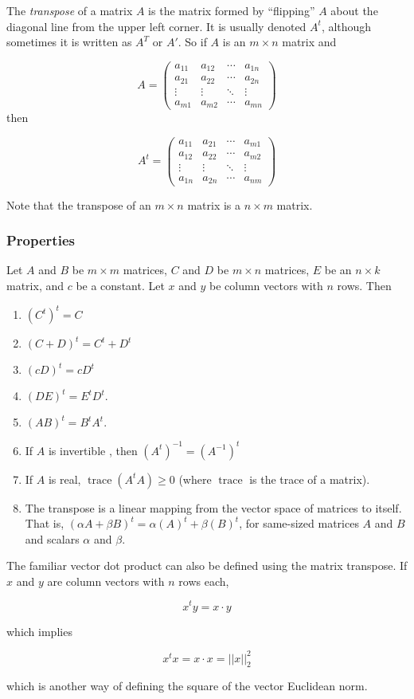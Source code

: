 \documentclass[12pt]{article}
\begin{document}
The \emph{transpose} of a matrix $A$ is the matrix formed by ``flipping'' $A$ about the diagonal line from the upper left corner.  It is usually denoted $A^t$, although sometimes it is written as $A^T$ or $A'$. So if $A$ is an $m \times n$ matrix and

$$
 A = 
\begin{pmatrix}
 a_{11} & a_{12} & \cdots & a_{1n} \\
 a_{21} & a_{22} & \cdots & a_{2n} \\
 \vdots & \vdots & \ddots & \vdots \\
 a_{m1} & a_{m2} & \cdots & a_{mn} 
\end{pmatrix} 
$$
then

$$ A^t =
\begin{pmatrix}
 a_{11} & a_{21} & \cdots & a_{m1} \\
 a_{12} & a_{22} & \cdots & a_{m2} \\
 \vdots & \vdots & \ddots & \vdots \\
 a_{1n} & a_{2n} & \cdots & a_{nm} 
\end{pmatrix} 
$$

Note that the transpose of an $m \times n$ matrix is a $n \times m$ matrix.

\subsubsection*{Properties}

Let $A$ and $B$ be $m \times m$ matrices, $C$ and $D$ be $m\times n$ matrices, $E$ be an $n\times k$ matrix, and $c$ be a constant.  Let $x$ and $y$ be column vectors with $n$ rows. Then

\begin{enumerate}
\item $(C^t)^t = C$
\item $(C+D)^t = C^t + D^t$
\item $(cD)^t = cD^t$
\item $(DE)^t=E^tD^t.$
\item $(AB)^t = B^t A^t.$
\item If $A$ is invertible , then $(A^t)^{-1} = (A^{-1})^t $
\item If $A$ is real, $\operatorname{trace}(A^tA) \ge 0$ (where $\operatorname{trace}$ is the trace of a matrix).
\item The transpose is a linear mapping from the vector space of matrices to itself.  That is, $(\alpha A + \beta B)^t = \alpha (A)^t + \beta (B)^t$, for same-sized matrices $A$ and $B$ and scalars $\alpha$ and $\beta$.
\end{enumerate}

The familiar vector dot product can also be defined using the matrix transpose.  If $x$ and $y$ are column vectors with $n$ rows each, 

$$ x^t y = x \cdot y $$

which implies

$$ x^t x = x \cdot x = ||x||_2^2 $$

which is another way of defining the square of the vector Euclidean norm.
\end{document}
